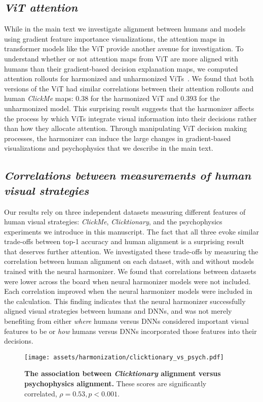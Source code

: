 \subsection{\textit{ViT attention}} While in the main text we investigate alignment between humans and models using gradient feature importance visualizations, the attention maps in transformer  models like the ViT provide another avenue for investigation. To understand whether or not attention maps from ViT are more aligned with humans than their gradient-based decision explanation maps, we computed attention rollouts for harmonized and unharmonized ViTs~\cite{Abnar2020-sb}. We found that both versions of the ViT had similar correlations between their attention rollouts and human \textit{ClickMe} maps: 0.38 for the harmonized ViT and 0.393 for the unharmonized model. This surprising result suggests that the harmonizer affects the process by which ViTs integrate visual information into their decisions rather than how they allocate attention. Through manipulating ViT decision making processes, the harmonizer can induce the large changes in gradient-based visualizations and psychophysics that we describe in the main text.

\subsection{\textit{Correlations between measurements of human visual strategies}}
Our results rely on three independent datasets measuring different features of human visual strategies: \textit{ClickMe}, \textit{Clicktionary}, and the psychophysics experiments we introduce in this manuscript. The fact that all three evoke similar trade-offs between top-1 accuracy and human alignment is a surprising result that deserves further attention. We investigated these trade-offs by measuring the correlation between human alignment on each dataset, with and without models trained with the neural harmonizer. We found that correlations between datasets were lower across the board when neural harmonizer models were not included. Each correlation improved when the neural harmonizer models were included in the calculation. This finding indicates that the neural harmonizer successfully aligned visual strategies between humans and DNNs, and was not merely benefiting from either \textit{where} humans versus DNNs considered important visual features to be or \textit{how} humans versus DNNs incorporated those features into their decisions.

\begin{figure}[h!]
\begin{center}
   \texttt{[image: assets/harmonization/clicktionary\_vs\_psych.pdf]}
\end{center}
   \caption{\textbf{The association between \textit{Clicktionary} alignment versus psychophysics alignment.} These scores are significantly correlated, $\rho=0.53, p<0.001$.}
\label{si_fig:clicktionary_vs_psych}
\end{figure}

